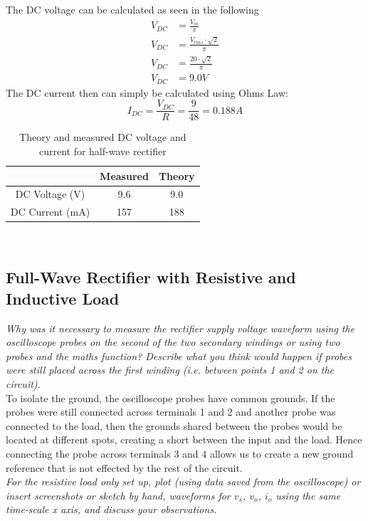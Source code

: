 \documentclass[12pt,a4paper]{article}
\begin{document}
The DC voltage can be calculated as seen in the following
\begin{align*}
V_{DC} &= \frac{V_m}{\pi} \\
V_{DC} &= \frac{V_{rms}\cdot\sqrt{2}}{\pi} \\
V_{DC} &= \frac{20\cdot\sqrt{2}}{\pi} \\
V_{DC} &= 9.0V
\end{align*}
The DC current then can simply be calculated using Ohms Law:
\[I_{DC} = \frac{V_{DC}}{R} = \frac{9}{48} = 0.188A\]

\begin{table}[H]
\caption{Theory and measured DC voltage and current for half-wave rectifier \label{tab:table1}}
\centering
\begin{tabular}{|c|c|c|}
\hline
 & Measured & Theory\\
\hline
DC Voltage (V) & 9.6 & 9.0\\
\hline
DC Current (mA) & 157 & 188\\
\hline
\end{tabular}
\end{table}\\

\subsection{Full-Wave Rectifier with Resistive and Inductive Load}
\textit{Why was it necessary to measure the rectifier supply voltage waveform using the oscilloscope
probes on the second of the two secondary windings or using two probes and the maths function?
Describe what you think would happen if probes were still placed across the first winding (i.e.
between points 1 and 2 on the circuit).}\\

To isolate the ground, the oscilloscope probes have common grounds. If the probes were still connected across terminals 1 and 2 and another probe was connected to the load, then the grounds shared between the probes would be located at different spots, creating a short between the input and the load. Hence connecting the probe across terminals 3 and 4 allows us to create a new ground reference that is not effected by the rest of the circuit.\\

\textit{For the resistive load only set up, plot (using data saved from the oscilloscope) or insert screenshots
or sketch by hand, waveforms for $v_s$, $v_o$, $i_o$ using the same time-scale x axis, and discuss your
observations.}\\
\end{document}
